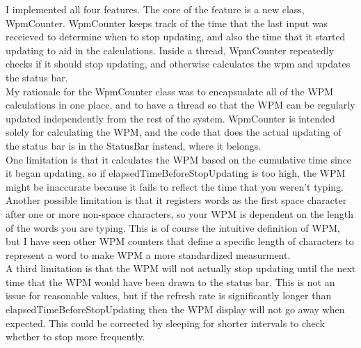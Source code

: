 \documentclass[12pt]{article}
\begin{document}
\maketitle

I implemented all four features.
The core of the feature is a new class, WpmCounter. WpmCounter keeps track
of the time that the last input was receieved to determine when to stop
updating, and also the time that it started updating to aid in the
calculations. Inside a thread, WpmCounter repeatedly checks if it should stop
updating, and otherwise calculates the wpm and updates the status bar. \\

My rationale for the WpmCounter class was to encapsualate all of the WPM
calculations in one place, and to have a thread so that the WPM can be
regularly updated independently from the rest of the system. WpmCounter is
intended solely for calculating the WPM, and the code that does the actual
updating of the status bar is in the StatusBar instead, where it belongs. \\

One limitation is that it calculates the WPM based on the cumulative time
since it began updating, so if elapsedTimeBeforeStopUpdating is too high, the
WPM might be inaccurate because it fails to reflect the time that you weren't
typing. \\

Another possible limitation is that it registers words as the first
space character after one or more non-space characters, so your WPM is
dependent on the length of the words you are typing. This is of course the
intuitive definition of WPM, but I have seen other WPM counters that define
a specific length of characters to represent a word to make WPM a more
standardized measurment. \\

A third limitation is that the WPM will not actually stop updating until the next time that the WPM would have been drawn to the status bar. This is not an issue for reasonable values, but if the refresh rate is significantly longer than elapsedTimeBeforeStopUpdating then the WPM display will not go away when expected. This could be corrected by sleeping for shorter intervals to check whether to stop more frequently. \\
\end{document}
